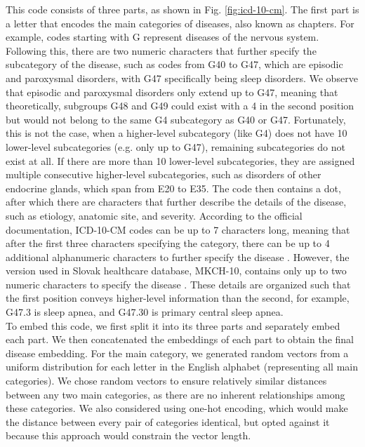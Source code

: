 This code consists of three parts, as shown in Fig. \ref{fig:icd-10-cm}. The first part is a letter that encodes the main categories of diseases, also known as chapters. For example, codes starting with G represent diseases of the nervous system. Following this, there are two numeric characters that further specify the subcategory of the disease, such as codes from G40 to G47, which are episodic and paroxysmal disorders, with G47 specifically being sleep disorders. We observe that episodic and paroxysmal disorders only extend up to G47, meaning that theoretically, subgroups G48 and G49 could exist with a 4 in the second position but would not belong to the same G4 subcategory as G40 or G47.\label{mkch_subdiv} Fortunately, this is not the case, when a higher-level subcategory (like G4) does not have 10 lower-level subcategories (e.g. only up to G47), remaining subcategories do not exist at all. If there are more than 10 lower-level subcategories, they are assigned multiple consecutive higher-level subcategories, such as disorders of other endocrine glands, which span from E20 to E35. The code then contains a dot, after which there are characters that further describe the details of the disease, such as etiology, anatomic site, and severity. According to the official documentation, ICD-10-CM codes can be up to 7 characters long, meaning that after the first three characters specifying the category, there can be up to 4 additional alphanumeric characters to further specify the disease \cite{icd10expl}. However, the version used in Slovak healthcare database, MKCH-10, contains only up to two numeric characters to specify the disease \cite{mkch10expl}. These details are organized such that the first position conveys higher-level information than the second, for example, G47.3 is sleep apnea, and G47.30 is primary central sleep apnea.
\\

To embed this code, we first split it into its three parts and separately embed each part. We then concatenated the embeddings of each part to obtain the final disease embedding. For the main category, we generated random vectors from a uniform distribution for each letter in the English alphabet (representing all main categories). We chose random vectors to ensure relatively similar distances between any two main categories, as there are no inherent relationships among these categories. We also considered using one-hot encoding, which would make the distance between every pair of categories identical, but opted against it because this approach would constrain the vector length.
\\

